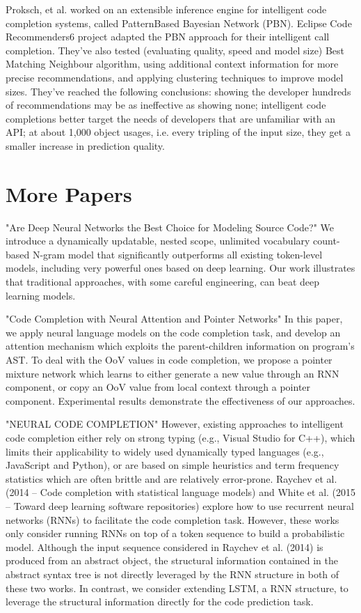 Proksch, et al. \cite{Prok15a} worked on an extensible inference engine for intelligent code completion
systems, called PatternBased Bayesian Network (PBN). Eclipse Code Recommenders6 project adapted
the PBN approach for their intelligent call completion. They've also tested (evaluating quality,
speed and model size) Best Matching Neighbour algorithm, using additional context information
for more precise recommendations, and applying clustering techniques to improve model sizes.
They've reached the following conclusions: showing the developer hundreds of recommendations
may be as ineffective as showing none; intelligent code completions better target the needs of
developers that are unfamiliar with an API; at about 1,000 object usages, i.e. every tripling
of the input size, they get a smaller increase in prediction quality.

\section{More Papers}
"Are Deep Neural Networks the Best Choice for Modeling Source Code?"
We introduce a dynamically updatable, nested scope, unlimited vocabulary count-based
N-gram model that significantly outperforms all existing token-level models, including
very powerful ones based on deep learning. Our work illustrates that traditional
approaches, with some careful engineering, can beat deep learning models.

"Code Completion with Neural Attention and Pointer Networks"
In this paper, we apply neural language models on the code completion task, and
develop an attention mechanism which exploits the parent-children information on
program’s AST. To deal with the OoV values in code completion, we propose a pointer
mixture network which learns to either generate a new value through an RNN component,
or copy an OoV value from local context through a pointer component. Experimental
results demonstrate the effectiveness of our approaches.

"NEURAL CODE COMPLETION"
However, existing approaches to intelligent code completion either rely on strong typing
(e.g., Visual Studio for C++), which limits their applicability to widely used dynamically
typed languages (e.g., JavaScript and Python), or are based on simple heuristics and term
frequency statistics which are often brittle and are relatively error-prone.
Raychev et al. (2014 -- Code completion with statistical language models) and White et al.
(2015 -- Toward deep learning software repositories) explore how to use recurrent neural networks
(RNNs) to facilitate the code completion task. However, these works only consider running
RNNs on top of a token sequence to build a probabilistic model. Although the input sequence
considered in Raychev et al. (2014) is produced from an abstract object, the structural
information contained in the abstract syntax tree is not directly leveraged by the RNN structure
in both of these two works. In contrast, we consider extending LSTM, a RNN structure,
to leverage the structural information directly for the code prediction task.

